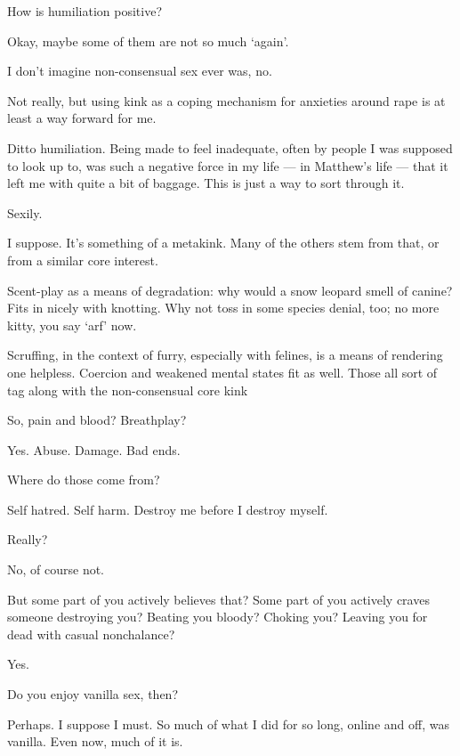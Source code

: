 \begin{ally}
How is humiliation positive?
\end{ally}
Okay, maybe some of them are not so much `again'.

\begin{ally}
I don't imagine non-consensual sex ever was, no.
\end{ally}
Not really, but using kink as a coping mechanism for anxieties around rape is at least a way forward for me.

Ditto humiliation. Being made to feel inadequate, often by people I was supposed to look up to, was such a negative force in my life --- in Matthew's life --- that it left me with quite a bit of baggage. This is just a way to sort through it.

\begin{ally}
Sexily.
\end{ally}
I suppose. It's something of a metakink. Many of the others stem from that, or from a similar core interest.

Scent-play as a means of degradation: why would a snow leopard smell of canine? Fits in nicely with knotting. Why not toss in some species denial, too; no more kitty, you say `arf' now.

Scruffing, in the context of furry, especially with felines, is a means of rendering one helpless. Coercion and weakened mental states fit as well. Those all sort of tag along with the non-consensual core kink

\begin{ally}
So, pain and blood? Breathplay?
\end{ally}
Yes. Abuse. Damage. Bad ends.

\begin{ally}
Where do those come from?
\end{ally}
Self hatred. Self harm. Destroy me before I destroy myself.

\begin{ally}
Really?
\end{ally}
No, of course not.

\begin{ally}
But some part of you actively believes that? Some part of you actively craves someone destroying you? Beating you bloody? Choking you? Leaving you for dead with casual nonchalance?
\end{ally}
Yes.
\newpage

\begin{ally}
Do you enjoy vanilla sex, then?
\end{ally}
Perhaps. I suppose I must. So much of what I did for so long, online and off, was vanilla. Even now, much of it is.

